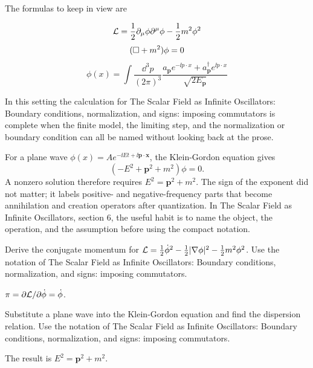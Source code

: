 The formulas to keep in view are

\[
  \mathcal L=\frac12\partial_\mu\phi\partial^\mu\phi-\frac12m^2\phi^2
\]
\[
  (\Box+m^2)\phi=0
\]
\[
  \phi(x)=\int\frac{\dd^3p}{(2\pi)^3}\frac{a_{\bm p}e^{-\ii p\cdot x}+a_{\bm p}^\dagger e^{\ii p\cdot x}}{\sqrt{2E_{\bm p}}}
\]

In this setting the calculation for The Scalar Field as Infinite Oscillators: Boundary conditions, normalization, and signs: imposing commutators is complete when the finite model, the limiting step, and the normalization or boundary condition can all be named without looking back at the prose.




\begin{example}
For a plane wave \(\phi(x)=Ae^{-\ii Et+\ii\bm p\cdot\bm x}\), the Klein-Gordon equation gives
\[
  (-E^2+\bm p^2+m^2)\phi=0.
\]
A nonzero solution therefore requires \(E^2=\bm p^2+m^2\).  The sign of the exponent did not matter; it labels positive- and negative-frequency parts that become annihilation and creation operators after quantization.  In The Scalar Field as Infinite Oscillators, section 6, the useful habit is to name the object, the operation, and the assumption before using the compact notation.
\end{example}



\begin{exercise}
Derive the conjugate momentum for \(\mathcal L=\frac12\dot\phi^2-\frac12|\nabla\phi|^2-\frac12m^2\phi^2\).  Use the notation of The Scalar Field as Infinite Oscillators: Boundary conditions, normalization, and signs: imposing commutators.
\begin{answer}
\(\pi=\partial\mathcal L/\partial\dot\phi=\dot\phi\).
\end{answer}
\end{exercise}

\begin{exercise}
Substitute a plane wave into the Klein-Gordon equation and find the dispersion relation.  Use the notation of The Scalar Field as Infinite Oscillators: Boundary conditions, normalization, and signs: imposing commutators.
\begin{answer}
The result is \(E^2=\bm p^2+m^2\).
\end{answer}
\end{exercise}



